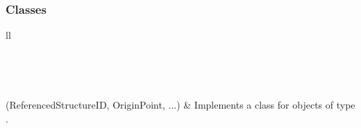 \documentclass[letterpaper,10pt,english]{sphinxmanual}
\begin{document}
\subsubsection{Classes}
\label{Chapters/PythonModuleReference/Patterns/TXLWizard.Patterns.Array:classes}
\begin{longtable}{ll}
\hline
\endfirsthead

%
{{}} \\
\hline
\endhead

\hline {} \\ \hline
\endfoot

\endlastfoot


{\hyperref[Chapters/PythonModuleReference/Patterns/TXLWizard.Patterns.Array:TXLWizard.Patterns.Array.Array]{}}(ReferencedStructureID, OriginPoint, ...)
 & 
Implements a class for  objects of type .
\\
\hline\end{longtable}

\end{document}
